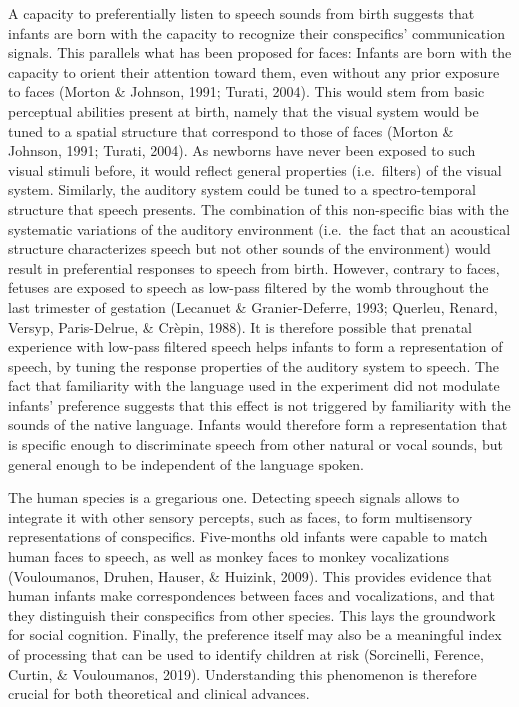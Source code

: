 \documentclass[
  english,
  man]{apa6}
\begin{document}
A capacity to preferentially listen to speech sounds from birth suggests that infants are born with the capacity to recognize their conspecifics' communication signals. This parallels what has been proposed for faces: Infants are born with the capacity to orient their attention toward them, even without any prior exposure to faces (Morton \& Johnson, 1991; Turati, 2004). This would stem from basic perceptual abilities present at birth, namely that the visual system would be tuned to a spatial structure that correspond to those of faces (Morton \& Johnson, 1991; Turati, 2004). As newborns have never been exposed to such visual stimuli before, it would reflect general properties (i.e.~filters) of the visual system. Similarly, the auditory system could be tuned to a spectro-temporal structure that speech presents. The combination of this non-specific bias with the systematic variations of the auditory environment (i.e.~the fact that an acoustical structure characterizes speech but not other sounds of the environment) would result in preferential responses to speech from birth. However, contrary to faces, fetuses are exposed to speech as low-pass filtered by the womb throughout the last trimester of gestation (Lecanuet \& Granier-Deferre, 1993; Querleu, Renard, Versyp, Paris-Delrue, \& Crèpin, 1988). It is therefore possible that prenatal experience with low-pass filtered speech helps infants to form a representation of speech, by tuning the response properties of the auditory system to speech.
The fact that familiarity with the language used in the experiment did not modulate infants' preference suggests that this effect is not triggered by familiarity with the sounds of the native language. Infants would therefore form a representation that is specific enough to discriminate speech from other natural or vocal sounds, but general enough to be independent of the language spoken.

The human species is a gregarious one. Detecting speech signals allows to integrate it with other sensory percepts, such as faces, to form multisensory representations of conspecifics. Five-months old infants were capable to match human faces to speech, as well as monkey faces to monkey vocalizations (Vouloumanos, Druhen, Hauser, \& Huizink, 2009). This provides evidence that human infants make correspondences between faces and vocalizations, and that they distinguish their conspecifics from other species. This lays the groundwork for social cognition. Finally, the preference itself may also be a meaningful index of processing that can be used to identify children at risk (Sorcinelli, Ference, Curtin, \& Vouloumanos, 2019). Understanding this phenomenon is therefore crucial for both theoretical and clinical advances.
\end{document}
